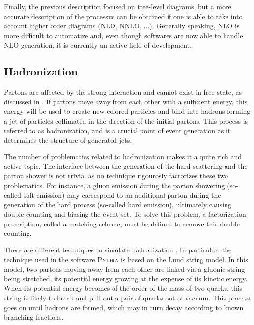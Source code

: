             Finally, the previous description focused on tree-level diagrams, but a more accurate
            description of the processus can be obtained if one is able to take into account higher order
            diagrams (NLO, NNLO, ...). Generally speaking, NLO is more difficult to
            automatize and, even though softwares are now able to handle NLO generation, it is
            currently an active field of development.

            \subsection{Hadronization}

            Partons are affected by the strong interaction and cannot exist in free state,
            as discussed in . If partons move away from
            each other with a sufficient energy, this energy will be used to create new colored
            particles and bind into hadrons forming a jet of particles collimated in the
            direction of the initial partons. This process is referred to as hadronization,
            and is a crucial point of event generation as it determines the structure
            of generated jets.

            The number of problematics related to hadronization makes it a quite rich and
            active topic. The interface between the generation of the hard scattering
            and the parton shower is not trivial as no technique rigourosly factorizes
            these two problematics. For instance, a gluon emission during
            the parton showering (so-called soft emission) may correspond to an additional
            parton during the generation of the hard process (so-called hard emission),
            ultimately causing double counting and biasing the event set. To solve this
            problem, a factorization prescription, called a matching scheme, must be defined
            to remove this double counting.

            There are different techniques to simulate hadronization \cite{MCGenPDG}. In particular, the
            technique used in the software \textsc{Pythia} is based on the Lund string
            model. In this model, two partons moving away from each other are linked
            via a gluonic string being stretched, its potential energy growing at
            the expense of its kinetic energy. When its potential energy becomes of the
            order of the mass of two quarks, this string is likely to break and pull
            out a pair of quarks out of vacuum. This process goes on until
            hadrons are formed, which may in turn decay according to known branching
            fractions.

